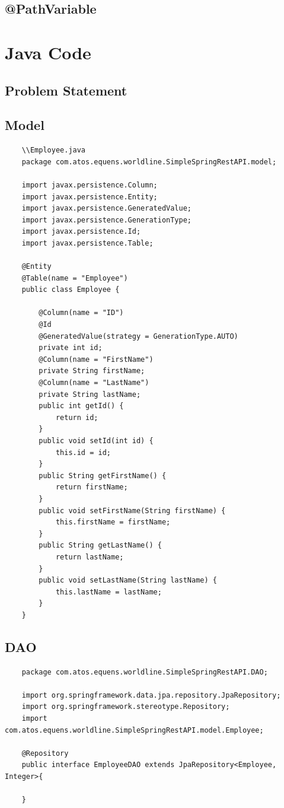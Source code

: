 \documentclass{report}
\begin{document}
	\subsection{@PathVariable}
	\section{Java Code}
	\subsection{Problem Statement}
	\subsection{Model}
	\begin{lstlisting}
	\\Employee.java
	package com.atos.equens.worldline.SimpleSpringRestAPI.model;
	
	import javax.persistence.Column;
	import javax.persistence.Entity;
	import javax.persistence.GeneratedValue;
	import javax.persistence.GenerationType;
	import javax.persistence.Id;
	import javax.persistence.Table;
	
	@Entity
	@Table(name = "Employee")
	public class Employee {
	
		@Column(name = "ID")
		@Id
		@GeneratedValue(strategy = GenerationType.AUTO)
		private int id;
		@Column(name = "FirstName")
		private String firstName;
		@Column(name = "LastName")
		private String lastName;
		public int getId() {
			return id;
		}
		public void setId(int id) {
			this.id = id;
		}
		public String getFirstName() {
			return firstName;
		}
		public void setFirstName(String firstName) {
			this.firstName = firstName;
		}
		public String getLastName() {
			return lastName;
		}
		public void setLastName(String lastName) {
			this.lastName = lastName;
		}		
	}
	\end{lstlisting}
	\subsection{DAO}
	\begin{lstlisting}
	package com.atos.equens.worldline.SimpleSpringRestAPI.DAO;
		
	import org.springframework.data.jpa.repository.JpaRepository;
	import org.springframework.stereotype.Repository;
	import com.atos.equens.worldline.SimpleSpringRestAPI.model.Employee;
		
	@Repository
	public interface EmployeeDAO extends JpaRepository<Employee, Integer>{

	}		
	\end{lstlisting}
\end{document}
